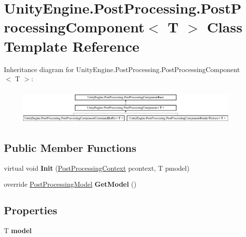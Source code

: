 \hypertarget{class_unity_engine_1_1_post_processing_1_1_post_processing_component}{}\section{Unity\+Engine.\+Post\+Processing.\+Post\+Processing\+Component$<$ T $>$ Class Template Reference}
\label{class_unity_engine_1_1_post_processing_1_1_post_processing_component}
Inheritance diagram for Unity\+Engine.\+Post\+Processing.\+Post\+Processing\+Component$<$ T $>$\+:\begin{figure}[H]
\begin{center}
\leavevmode
\includegraphics[height=1.854305cm]{class_unity_engine_1_1_post_processing_1_1_post_processing_component}
\end{center}
\end{figure}
\subsection*{Public Member Functions}
\begin{DoxyCompactItemize}
\item 
\mbox{\label{class_unity_engine_1_1_post_processing_1_1_post_processing_component_a982348916489395b61300b2ed37784a3}} 
virtual void {\bfseries Init} (\hyperlink{class_unity_engine_1_1_post_processing_1_1_post_processing_context}{Post\+Processing\+Context} pcontext, T pmodel)
\item 
\mbox{\label{class_unity_engine_1_1_post_processing_1_1_post_processing_component_ac946ffb514e0ebb0141e87777459ffc9}} 
override \hyperlink{class_unity_engine_1_1_post_processing_1_1_post_processing_model}{Post\+Processing\+Model} {\bfseries Get\+Model} ()
\end{DoxyCompactItemize}
\subsection*{Properties}
\begin{DoxyCompactItemize}
\item 
\mbox{\label{class_unity_engine_1_1_post_processing_1_1_post_processing_component_a7af78d4436d104b01373d1bf0f7bcedf}} 
T {\bfseries model}
\end{DoxyCompactItemize}
